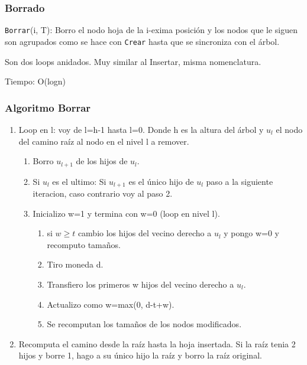 \documentclass[10pt]{beamer}
\begin{document}

\begin{frame}
\frametitle{Borrado}
\texttt{Borrar}(i, T): Borro el nodo hoja de la i-exima posición y los nodos que le siguen son agrupados
  como se hace con  \texttt{Crear} hasta que se sincroniza con el árbol.

  Son dos loops anidados. Muy similar al Insertar, misma nomenclatura.

  Tiempo: O(logn)

\end{frame}

\begin{frame}
\frametitle{Algoritmo Borrar}

 \begin{enumerate}\itemsep-1em
  \item Loop en l: voy de l=h-1 hasta l=0.
    Donde h es la altura del árbol y $u_l$ el nodo del camino raíz al nodo en el nivel l a remover.
    \vspace{-0.4cm}
    \begin{enumerate}[a]\itemsep-1em
    \item Borro $u_{l+1}$ de los hijos de $u_l$.
\pause
    \item Si $u_l$ es el ultimo: Si $u_{l+1}$ es el único hijo de $u_l$ paso a la siguiente iteracion, caso contrario
      voy al paso 2.
    \item Inicializo w=1 y termina con w=0 (loop en nivel l).
          \vspace{-0.4cm}
      \begin{enumerate}[i]\itemsep-1em
\pause
        \item si $w\geq t$ cambio los hijos del vecino derecho a $u_l$ y pongo w=0 y recomputo  tama\~nos.
        \item Tiro moneda d.
\pause
        \item Transfiero los  primeros w hijos del vecino derecho a $u_l$.
        \item Actualizo como w=max(0, d-t+w).
\pause
        \item Se recomputan los tama\~nos de los nodos modificados.
      \end{enumerate}
  \end{enumerate}
\pause
  \item  Recomputa el camino desde la raíz hasta la hoja insertada.
  Si la raíz tenia 2 hijos y borre 1, hago a su único hijo la raíz y borro la raíz original.
\end{enumerate}
\end{frame}
\end{document}
